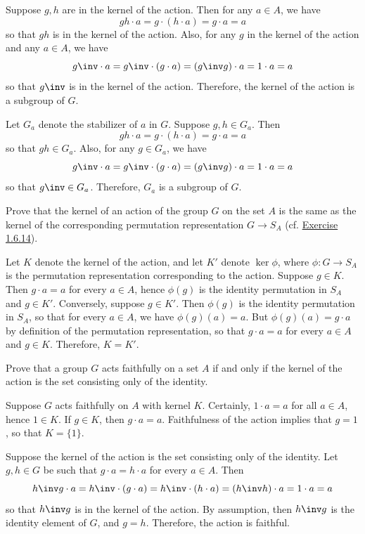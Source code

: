 \begin{solalph}
    \item Suppose $g, h$ are in the kernel of the action. Then for any $a \in A$, we have
    \[gh \cdot a = g \cdot (h \cdot a) = g \cdot a = a\]
    so that $gh$ is in the kernel of the action. Also, for any $g$ in the kernel of the action and any $a \in A$, we have
    \[g\inv \cdot a = g\inv \cdot (g \cdot a) = (g\inv g) \cdot a = 1 \cdot a = a\]
    so that $g\inv$ is in the kernel of the action. Therefore, the kernel of the action is a subgroup of $G$.
    \item Let $G_a$ denote the stabilizer of $a$ in $G$. Suppose $g, h \in G_a$. Then
    \[gh \cdot a = g \cdot (h \cdot a) = g \cdot a = a\]
    so that $gh \in G_a$. Also, for any $g \in G_a$, we have
    \[g\inv \cdot a = g\inv \cdot (g \cdot a) = (g\inv g) \cdot a = 1 \cdot a = a\]
    so that $g\inv \in G_a$. Therefore, $G_a$ is a subgroup of $G$.
\end{solalph}

\begin{exercise}\label{ex1.7.5}
    Prove that the kernel of an action of the group $G$ on the set $A$ is the same as the kernel of the corresponding permutation representation $G\to S_A$ (cf. \hyperref[ex1.6.14]{Exercise 1.6.14}).
\end{exercise}

\begin{sol}
    Let $K$ denote the kernel of the action, and let $K'$ denote $\ker\phi$, where $\phi : G \to S_A$ is the permutation representation corresponding to the action. Suppose $g \in K$. Then $g \cdot a = a$ for every $a \in A$, hence $\phi(g)$ is the identity permutation in $S_A$ and $g \in K'$. Conversely, suppose $g \in K'$. Then $\phi(g)$ is the identity permutation in $S_A$, so that for every $a \in A$, we have $\phi(g)(a) = a$. But $\phi(g)(a) = g \cdot a$ by definition of the permutation representation, so that $g \cdot a = a$ for every $a \in A$ and $g \in K$. Therefore, $K = K'$.
\end{sol}

\begin{exercise}\label{ex1.7.6}
    Prove that a group $G$ acts faithfully on a set $A$ if and only if the kernel of the action is the set consisting only of the identity.
\end{exercise}

\begin{solitem}
    \item [\rightimp] Suppose $G$ acts faithfully on $A$ with kernel $K$. Certainly, $1 \cdot a = a$ for all $a \in A$, hence $1 \in K$. If $g \in K$, then $g \cdot a = a$. Faithfulness of the action implies that $g = 1$, so that $K = \{1\}$.
    \item [\leftimp] Suppose the kernel of the action is the set consisting only of the identity. Let $g, h \in G$ be such that $g \cdot a = h \cdot a$ for every $a \in A$. Then
    \[h\inv g \cdot a = h\inv \cdot (g \cdot a) = h\inv \cdot (h \cdot a) = (h\inv h) \cdot a = 1 \cdot a = a\]
    so that $h\inv g$ is in the kernel of the action. By assumption, then $h\inv g$ is the identity element of $G$, and $g = h$. Therefore, the action is faithful.
\end{solitem}

